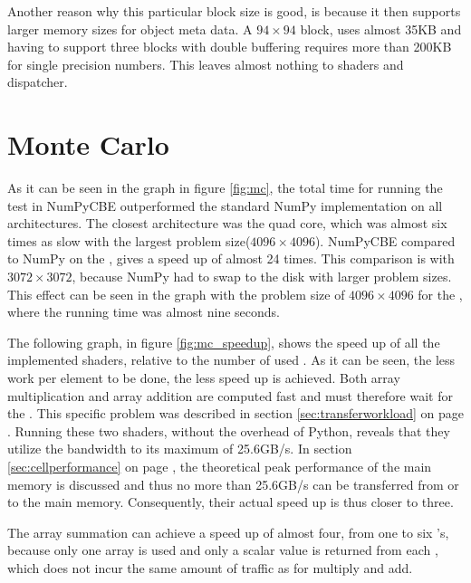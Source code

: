 Another reason why this particular block size is good, is because it
then supports larger memory sizes for object meta data. A $94 \times
94$ block, uses almost 35KB and having to support three blocks with
double buffering requires more than 200KB for single precision
numbers. This leaves almost nothing to shaders and dispatcher.


\section{Monte Carlo}

As it can be seen in the graph in figure \ref{fig:mc}, the total time
for running the test in NumPyCBE outperformed the standard NumPy
implementation on all architectures. The closest architecture was the
quad core, which was almost six times as slow with the largest problem
size($4096 \times 4096$). NumPyCBE compared to NumPy on the \PPE{},
gives a speed up of almost 24 times. This comparison is with $3072
\times 3072$, because NumPy had to swap to the disk with larger
problem sizes. This effect can be seen in the graph with the problem
size of $4096 \times 4096$ for the \PPE{}, where the running time was
almost nine seconds.


The following graph, in figure \ref{fig:mc_speedup}, shows the speed
up of all the implemented shaders, relative to the number of used
. As it can be seen, the less work per element to be done, the less speed
up is achieved. Both array multiplication and array addition are
computed fast and must therefore wait for the \EIB{}. This specific
problem was described in section \ref{sec:transferworkload} on page
\pageref{sec:transferworkload}. Running these two shaders, without the
overhead of Python, reveals that they utilize the bandwidth to its
maximum of 25.6GB/s. In section \ref{sec:cellperformance} on page
\pageref{sec:cellperformance}, the theoretical peak performance of the
main memory is discussed and thus no more than 25.6GB/s can be
transferred from or to the main memory. Consequently, their actual
speed up is thus closer to three.

The array summation can achieve a speed up of almost four, from one to
six \SPE{}'s, because only one array is used and only a scalar value
is returned from each \SPE{}, which does not incur the same amount of
traffic as for multiply and add.

